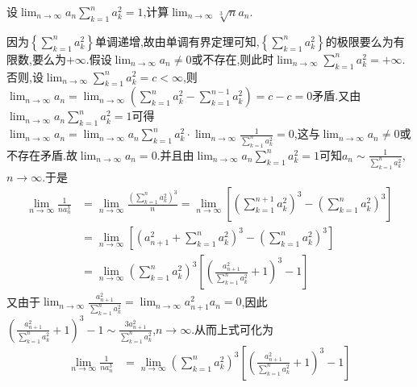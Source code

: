\documentclass[lang=cn,newtx,10pt,scheme=chinese]{elegantbook}
\begin{document}
\begin{example}
设\(\lim_{n \to \infty} a_n \sum\limits_{k = 1}^{n} a_{k}^{2} = 1\),计算\(\lim_{n \to \infty} \sqrt[3]{n}a_n\).
\end{example}
\begin{solution}
   因为\(\left\{\sum\limits_{k = 1}^n{a_{k}^{2}}\right\}\)单调递增,故由单调有界定理可知,\(\left\{\sum\limits_{k = 1}^n{a_{k}^{2}}\right\}\)的极限要么为有限数,要么为\(+\infty\).假设\(\lim_{n\rightarrow\infty}a_n\neq 0\)或不存在,则此时\(\lim_{n\rightarrow\infty}\sum\limits_{k = 1}^n{a_{k}^{2}}=+\infty\).否则,设\(\lim_{n\rightarrow\infty}\sum\limits_{k = 1}^n{a_{k}^{2}}=c <\infty\),则\(\lim_{n\rightarrow\infty}a_n=\lim_{n\rightarrow\infty}\left(\sum\limits_{k = 1}^n{a_{k}^{2}}-\sum\limits_{k = 1}^{n - 1}{a_{k}^{2}}\right)=c - c = 0\)矛盾.又由\(\lim_{n\rightarrow\infty}a_n\sum\limits_{k = 1}^n{a_{k}^{2}}=1\)可得\(\lim_{n\rightarrow\infty}a_n=\lim_{n\rightarrow\infty}a_n\sum\limits_{k = 1}^n{a_{k}^{2}}\cdot\lim_{n\rightarrow\infty}\frac{1}{\sum\limits_{k = 1}^n{a_{k}^{2}}}=0\),这与\(\lim_{n\rightarrow\infty}a_n\neq 0\)或不存在矛盾.故\(\lim_{n\rightarrow\infty}a_n = 0\).并且由\(\lim_{n\rightarrow\infty}a_n\sum\limits_{k = 1}^n{a_{k}^{2}}=1\)可知\(a_n\sim\frac{1}{\sum\limits_{k = 1}^n{a_{k}^{2}}}\),\(n\rightarrow\infty\).于是
\begin{align*}
\lim_{n\rightarrow\infty}\frac{1}{na_{n}^{3}}&=\lim_{n\rightarrow\infty}\frac{\left(\sum\limits_{k = 1}^n{a_{k}^{2}}\right)^3}{n}=\lim_{n\rightarrow\infty}\left[\left(\sum\limits_{k = 1}^{n + 1}{a_{k}^{2}}\right)^3-\left(\sum\limits_{k = 1}^n{a_{k}^{2}}\right)^3\right]\\
&=\lim_{n\rightarrow\infty}\left[\left(a_{n + 1}^{2}+\sum\limits_{k = 1}^n{a_{k}^{2}}\right)^3-\left(\sum\limits_{k = 1}^n{a_{k}^{2}}\right)^3\right]\\
&=\lim_{n\rightarrow\infty}\left(\sum\limits_{k = 1}^n{a_{k}^{2}}\right)^3\left[\left(\frac{a_{n + 1}^{2}}{\sum\limits_{k = 1}^n{a_{k}^{2}}}+1\right)^3 - 1\right]
\end{align*}
又由于\(\lim_{n\rightarrow\infty}\frac{a_{n + 1}^{2}}{\sum\limits_{k = 1}^n{a_{k}^{2}}}=\lim_{n\rightarrow\infty}a_{n + 1}^{2}a_n = 0\),因此\(\left(\frac{a_{n + 1}^{2}}{\sum\limits_{k = 1}^n{a_{k}^{2}}}+1\right)^3 - 1\sim\frac{3a_{n + 1}^{2}}{\sum\limits_{k = 1}^n{a_{k}^{2}}}\),\(n\rightarrow\infty\).从而上式可化为
\begin{align*}
\lim_{n\rightarrow\infty}\frac{1}{na_{n}^{3}}&=\lim_{n\rightarrow\infty}\left(\sum\limits_{k = 1}^n{a_{k}^{2}}\right)^3\left[\left(\frac{a_{n + 1}^{2}}{\sum\limits_{k = 1}^n{a_{k}^{2}}}+1\right)^3 - 1\right]\\

\end{align*}
\end{solution}
\end{document}
